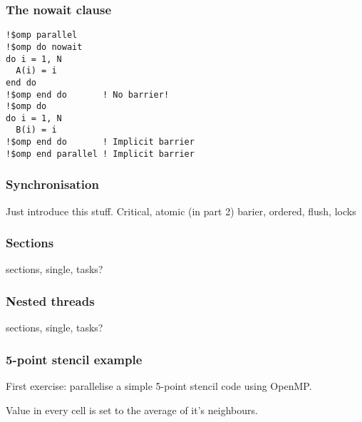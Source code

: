 \documentclass{beamer}
\begin{document}
\begin{frame}[fragile]
\frametitle{The nowait clause}

\begin{verbatim}
!$omp parallel
!$omp do nowait
do i = 1, N
  A(i) = i
end do
!$omp end do       ! No barrier!
!$omp do
do i = 1, N
  B(i) = i
!$omp end do       ! Implicit barrier
!$omp end parallel ! Implicit barrier
\end{verbatim}
\end{frame}

\begin{frame}
\frametitle{Synchronisation}
Just introduce this stuff.
Critical, atomic (in part 2)
barier, ordered, flush, locks
\end{frame}

\begin{frame}
\frametitle{Sections}
sections, single, tasks?
\end{frame}

\begin{frame}
\frametitle{Nested threads}
sections, single, tasks?
\end{frame}

\begin{frame}
\frametitle{5-point stencil example}
First exercise: parallelise a simple 5-point stencil code using OpenMP.

\begin{center}
\end{center}

Value in every cell is set to the average of it's neighbours.
\end{frame}
\end{document}
